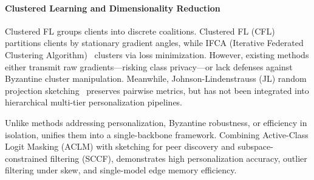 \paragraph{Clustered Learning and Dimensionality Reduction}
Clustered FL groups clients into discrete coalitions. Clustered FL (CFL)~\cite{sattler2020clustered} partitions clients by stationary gradient angles, while IFCA (Iterative Federated Clustering Algorithm)~\cite{ghosh2020efficient} clusters via loss minimization. However, existing methods either transmit raw gradients---risking class privacy---or lack defenses against Byzantine cluster manipulation. Meanwhile, Johnson-Lindenstrauss (JL) random projection sketching~\cite{johnson1984extensions,woodruff2014sketching} preserves pairwise metrics, but has not been integrated into hierarchical multi-tier personalization pipelines.

Unlike methods addressing personalization, Byzantine robustness, or efficiency in isolation, \fedhep{} unifies them into a single-backbone framework. Combining Active-Class Logit Masking (ACLM) with sketching for peer discovery and subspace-constrained filtering (SCCF), \fedhep{} demonstrates high personalization accuracy, outlier filtering under skew, and single-model edge memory efficiency.
